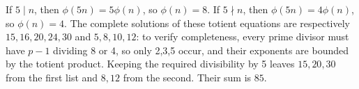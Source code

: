 If $5\mid n$, then $\phi(5n)=5\phi(n)$, so $\phi(n)=8$. If $5\nmid n$, then $\phi(5n)=4\phi(n)$, so $\phi(n)=4$. The complete solutions of these totient equations are respectively $15,16,20,24,30$ and $5,8,10,12$: to verify completeness, every prime divisor must have $p-1$ dividing 8 or 4, so only 2,3,5 occur, and their exponents are bounded by the totient product. Keeping the required divisibility by 5 leaves $15,20,30$ from the first list and $8,12$ from the second. Their sum is $\boxed{85}$.
